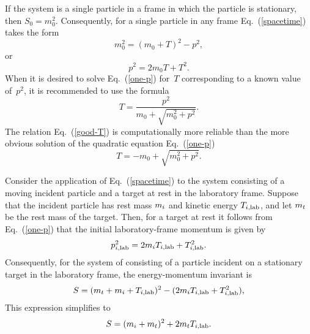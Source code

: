 {If the system is a single particle
in a frame in which the particle is stationary, then $S_0 = m_0^2$.
Consequently, for a single particle in
any frame Eq.~(\ref{spacetime}) takes the form
\begin{equation}
  m_0^2 = (m_0 + T)^2 - p^2,
 \label{spacetime-1}
\end{equation}
or
\begin{equation}
  p^2  = 2m_0 T + T^2.
  \label{one-p}
\end{equation}
When it is desired to solve Eq.~(\ref{one-p}) for~$T$ corresponding
to a known value of~$p^2$, it is recommended to use the formula
\begin{equation}
  T = \frac{p^2 }
          {m_0 + \sqrt{ m_0^2 + p^2 }}.
 \label{good-T}
\end{equation}
The relation Eq.~(\ref{good-T}) is computationally more reliable
than the more obvious solution of the quadratic equation Eq.~(\ref{one-p})
$$
  T = -m_0 + \sqrt{ m_0^2 + p^2 }.
$$

Consider the application of Eq.~(\ref{spacetime}) to the system
consisting of a moving incident particle and a target 
at rest in
the laboratory frame.  Suppose that the incident
particle has rest mass $m_i$ and kinetic
energy $T_{i,\textrm{lab}}$, and let $m_t$ be the rest mass of the
target.  Then, for a target at rest it follows from Eq.~(\ref{one-p})
that the initial laboratory-frame momentum is given by
\begin{equation}
  p_{i,\textrm{lab}}^2  = 2m_i T_{i,\textrm{lab}} + T_{i,\textrm{lab}}^2.
 \label{p-lab-in}
\end{equation}
Consequently, for the system of consisting of a particle
incident on a stationary target
in the laboratory frame, the energy-momentum invariant is
$$
  S = (m_t + m_i + T_{i,\textrm{lab}})^2 -
      ( 2m_i T_{i,\textrm{lab}} + T_{i,\textrm{lab}}^2 ),
$$
This expression simplifies to
\begin{equation}
  S = (m_i + m_t )^2 + 2m_t T_{i,\textrm{lab}}.
  \label{S-lab}
\end{equation}

}
